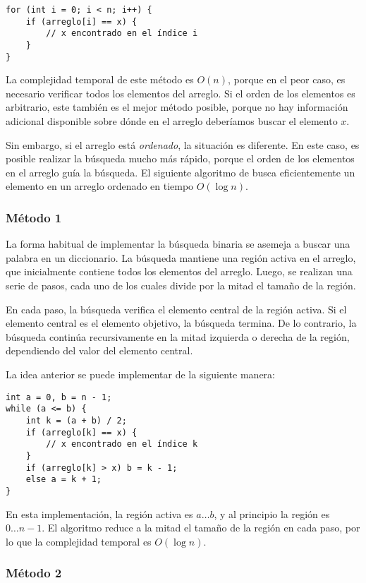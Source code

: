 \begin{lstlisting}
for (int i = 0; i < n; i++) {
    if (arreglo[i] == x) {
        // x encontrado en el índice i
    }
}
\end{lstlisting}

La complejidad temporal de este método es $O(n)$,
porque en el peor caso, es necesario verificar
todos los elementos del arreglo.
Si el orden de los elementos es arbitrario,
este también es el mejor método posible, porque
no hay información adicional disponible sobre dónde
en el arreglo deberíamos buscar el elemento $x$.

Sin embargo, si el arreglo está \emph{ordenado},
la situación es diferente.
En este caso, es posible realizar la
búsqueda mucho más rápido, porque el orden de los
elementos en el arreglo guía la búsqueda.
El siguiente algoritmo de 
busca eficientemente un elemento en un arreglo ordenado
en tiempo $O(\log n)$.

\subsubsection{Método 1}

La forma habitual de implementar la búsqueda binaria
se asemeja a buscar una palabra en un diccionario.
La búsqueda mantiene una región activa en el arreglo,
que inicialmente contiene todos los elementos del arreglo.
Luego, se realizan una serie de pasos,
cada uno de los cuales divide por la mitad el tamaño de la región.

En cada paso, la búsqueda verifica el elemento central
de la región activa.
Si el elemento central es el elemento objetivo,
la búsqueda termina.
De lo contrario, la búsqueda continúa recursivamente
en la mitad izquierda o derecha de la región,
dependiendo del valor del elemento central.

La idea anterior se puede implementar de la siguiente manera:
\begin{lstlisting}
int a = 0, b = n - 1;
while (a <= b) {
    int k = (a + b) / 2;
    if (arreglo[k] == x) {
        // x encontrado en el índice k
    }
    if (arreglo[k] > x) b = k - 1;
    else a = k + 1;
}
\end{lstlisting}

En esta implementación, la región activa es $a \ldots b$,
y al principio la región es $0 \ldots n-1$.
El algoritmo reduce a la mitad el tamaño de la región en cada paso,
por lo que la complejidad temporal es $O(\log n)$.

\subsubsection{Método 2}

